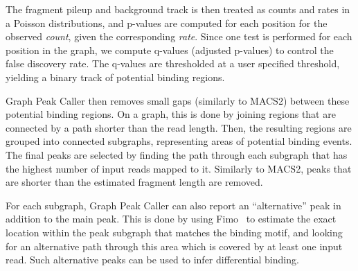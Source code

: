 \documentclass[10pt,letterpaper]{article}
\begin{document}
The fragment pileup and background track is then treated as counts and rates in a Poisson distributions, and p-values are computed for each position for the observed \emph{count}, given the corresponding \emph{rate}. Since one test is performed for each position in the graph, we compute q-values (adjusted p-values) to control the false discovery rate. The q-values are thresholded at a user specified threshold, yielding a binary track of potential binding regions. 

Graph Peak Caller then removes small gaps (similarly to MACS2) between these potential binding regions. On a graph, this is done by joining regions that are connected by a path shorter than the read length. Then, the resulting regions are grouped into connected subgraphs, representing areas of potential binding events. The final peaks are selected by finding the path through each subgraph that has the highest number of input reads mapped to it. Similarly to MACS2, peaks that are shorter than the estimated fragment length are removed. 

For each subgraph, Graph Peak Caller can also report an “alternative” peak in addition to the main peak. This is done by using Fimo~\cite{fimo} to estimate the exact location within the peak subgraph that matches the binding motif, and looking for an alternative path through this area which is covered by at least one input read. Such alternative peaks can be used to infer differential binding.
\end{document}
